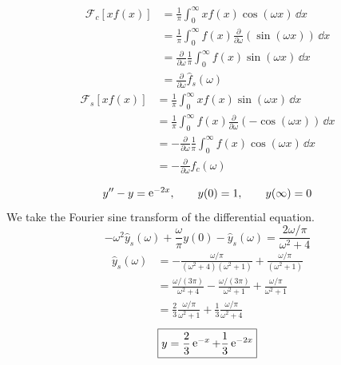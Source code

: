 {%
\begin{Solution}
  \label{solution ode ft fc xf(x) fs xf(x)}
  \begin{align*}
    \mathcal{F}_c[x f(x)]
    &= \frac{1}{\pi} \int_0^\infty x f(x) \cos(\omega x)\,\dd x \\
    &= \frac{1}{\pi} \int_0^\infty f(x) \frac{\partial}{\partial \omega} (\sin(\omega x))
    \,\dd x \\
    &= \frac{\partial}{\partial \omega} \frac{1}{\pi} \int_0^\infty f(x) \sin(\omega x)\,\dd x \\
    &= \frac{\partial}{\partial \omega} \hat{f}_s(\omega)
  \end{align*}
  \begin{align*}
    \mathcal{F}_s[x f(x)] 
    &= \frac{1}{\pi} \int_0^\infty x f(x) \sin(\omega x)\,\dd x \\
    &= \frac{1}{\pi} \int_0^\infty f(x) \frac{\partial}{\partial \omega} (- \cos(\omega x))
    \,\dd x \\
    &= - \frac{\partial}{\partial \omega} \frac{1}{\pi} \int_0^\infty f(x) \cos(\omega x)
    \,\dd x \\
    &= - \frac{\partial}{\partial \omega} \hat{f}_c(\omega)
  \end{align*}
\end{Solution}









\begin{Solution}
  \label{solution ode ft y-y=e-2x}
  \[ y'' - y = \mathop{\mathrm{e}}\nolimits^{-2 x}, \qquad y(0) = 1, \qquad y(\infty) = 0 \]
  We take the Fourier sine transform of the differential equation.
  \[ -\omega^2 \hat{y}_s(\omega) + \frac{\omega}{\pi}y(0) - \hat{y}_s(\omega) = 
  \frac{2\omega / \pi}{\omega^2 + 4} \]
  \begin{align*}
    \hat{y}_s(\omega)
    &= - \frac{\omega / \pi}{(\omega^2 + 4)(\omega^2 + 1)}
    + \frac{\omega / \pi}{(\omega^2 + 1)} \\
    &= \frac{\omega / (3\pi)}{\omega^2 + 4} 
    - \frac{\omega / (3\pi)}{\omega^2 + 1}
    + \frac{\omega / \pi}{\omega^2 + 1} \\
    &= \frac{2}{3} \frac{\omega / \pi}{\omega^2 + 1}
    + \frac{1}{3} \frac{\omega / \pi}{\omega^2 + 4}
  \end{align*}
  \[ \boxed{ y = \frac{2}{3} \mathop{\mathrm{e}}\nolimits^{-x} + \frac{1}{3} \mathop{\mathrm{e}}\nolimits^{-2 x} } \]
\end{Solution}





}
